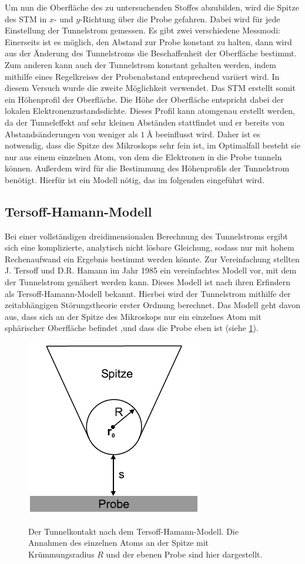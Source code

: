 \documentclass[
	a4paper,
	12pt,
	pagesize,
	ngerman
]{scrartcl}
\begin{document}
Um nun die Oberfläche des zu untersuchenden Stoffes abzubilden, wird die Spitze des STM in $x$- und $y$-Richtung über die Probe gefahren. Dabei wird für jede Einstellung der Tunnelstrom gemessen. Es gibt zwei verschiedene Messmodi: Einerseits ist es möglich, den Abstand zur Probe konstant zu halten, dann wird aus der Änderung des Tunnelstroms die Beschaffenheit der Oberfläche bestimmt. Zum anderen kann auch der Tunnelstrom konstant gehalten werden, indem mithilfe eines Regelkreises der Probenabstand entsprechend variiert wird. In diesem Versuch wurde die zweite Möglichkeit verwendet. Das STM erstellt somit ein Höhenprofil der Oberfläche. Die Höhe der Oberfläche entspricht dabei der lokalen Elektronenzustandsdichte. Dieses Profil kann atomgenau erstellt werden, da der Tunneleffekt auf sehr kleinen Abständen stattfindet und er bereits von Abstandsänderungen von weniger als $\SI{1}{\angstrom}$ beeinflusst wird. Daher ist es notwendig, dass die Spitze des Mikroskops sehr fein ist, im Optimalfall besteht sie nur aus einem einzelnen Atom, von dem die Elektronen in die Probe tunneln können. Außerdem wird für die Bestimmung des Höhenprofils der Tunnelstrom benötigt. Hierfür ist ein Modell nötig, das im folgenden eingeführt wird.

\subsection{Tersoff-Hamann-Modell}
Bei einer vollständigen dreidimensionalen Berechnung des Tunnelstroms ergibt sich eine komplizierte, analytisch nicht lösbare Gleichung, sodass nur mit hohem Rechenaufwand ein Ergebnis bestimmt werden könnte. Zur Vereinfachung stellten J. Tersoff und D.R. Hamann im Jahr 1985 ein vereinfachtes Modell vor, mit dem der Tunnelstrom genähert werden kann. Dieses Modell ist nach ihren Erfindern als Tersoff-Hamann-Modell bekannt. Hierbei wird der Tunnelstrom mithilfe der zeitabhängigen Störungstheorie erster Ordnung berechnet. Das Modell geht davon aus, dass sich an der Spitze des Mikroskops nur ein einzelnes Atom mit sphärischer Oberfläche befindet ,und dass die Probe eben ist (siehe \cref{spitze}).

\begin{figure}[h!]
	\centering
	\includegraphics[scale=0.8]{spitze.png}
	\label{spitze}
	\caption{Der Tunnelkontakt nach dem Tersoff-Hamann-Modell. Die Annahmen des einzelnen Atoms an der Spitze mit Krümmungsradius $R$ und der ebenen Probe sind hier dargestellt.}
\end{figure}
\end{document}
